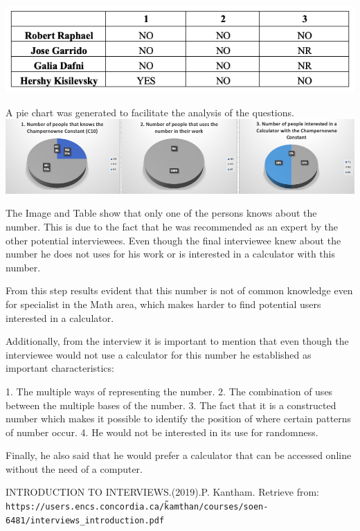 \documentclass{article}
\begin{document}
\includegraphics[scale=0.5]{images/table.png}

A pie chart was generated to facilitate the analysis of the questions.\\

\includegraphics[scale=0.5]{images/pie.png}

The Image and Table show that only one of the persons knows about the number. This is due to the fact that he was recommended as an expert by the other potential interviewees. Even though the final interviewee knew about the number he does not uses for his work or is interested in a calculator with this number.

From this step results evident that this number is not of common knowledge even for specialist in the Math area, which makes harder to find potential users interested in a calculator.

Additionally, from the interview it is important to mention that even though the interviewee would not use a calculator for this number he established as important characteristics:

1. The multiple ways of representing the number.
2. The combination of uses between the multiple bases of the number.
3. The fact that it is a constructed number which makes it possible to identify the position of where certain patterns of number occur.
4. He would not be interested in its use for randomness.

Finally, he also said that he would prefer a calculator that can be accessed online without the need of a computer.


\begin{thebibliography}{9}

INTRODUCTION TO INTERVIEWS.(2019).P. Kantham. Retrieve from:
\\\texttt{https://users.encs.concordia.ca/\~kamthan/courses/soen-6481/interviews\_introduction.pdf}
 
\end{thebibliography}
\end{document}
